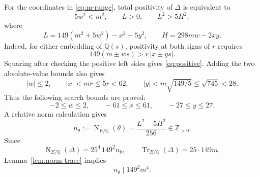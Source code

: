 \documentclass[11pt]{article}
\newcommand{\Q}{\mathbb Q}
\newcommand{\Z}{\mathbb Z}
\newcommand{\Tr}{\operatorname{Tr}}
\newcommand{\Nm}{\operatorname{N}}
\numberwithin{equation}{section}
\begin{document}
For the coordinates in \eqref{eq:m-range}, total positivity of $\Delta$ is
equivalent to
\begin{equation}\label{eq:positive}
5w^2<m^2,\qquad L>0,\qquad L^2>5H^2,
\end{equation}
where
\begin{equation}\label{eq:L-H}
L=149(m^2+5w^2)-x^2-5y^2,\qquad H=298mw-2xy.
\end{equation}
Indeed, for either embedding of $\Q(s)$, positivity at both signs of $r$
requires
\[
149(m\pm ws)>r\,|x\pm ys|.
\]
Squaring after checking the positive left sides gives \eqref{eq:positive}.
Adding the two absolute-value bounds also gives
\[
|w|\le2,\qquad |x|<mr\le5r<62,\qquad
|y|<m\sqrt{149/5}\le\sqrt{745}<28.
\]
Thus the following search bounds are proved:
\begin{equation}\label{eq:box}
-2\le w\le2,\qquad -61\le x\le61,\qquad -27\le y\le27.
\end{equation}
A relative norm calculation gives
\begin{equation}\label{eq:normtheta}
n_\theta:=\Nm_{E/\Q}(\theta)=\frac{L^2-5H^2}{256}\in\Z_{>0}.
\end{equation}
Since
\[
\Nm_{E/\Q}(\Delta)=25^4\,149^2 n_\theta,
\qquad \Tr_{E/\Q}(\Delta)=25\cdot149m,
\]
Lemma~\ref{lem:norm-trace} implies
\begin{equation}\label{eq:necessary-divisor}
n_\theta\mid149^2m^4.
\end{equation}
\end{document}
